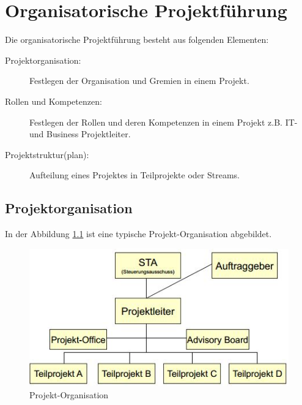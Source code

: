 \chapter{Organisatorische Projektführung}

Die organisatorische Projektführung besteht aus folgenden Elementen:
\begin{description}
	\item[Projektorganisation:] Festlegen der Organisation und Gremien in einem Projekt.
	\item[Rollen und Kompetenzen:] Festlegen der Rollen und deren Kompetenzen in einem Projekt z.B. IT- und Business Projektleiter.
	\item[Projektstruktur(plan):] Aufteilung eines Projektes in Teilprojekte oder Streams.
\end{description}

\section{Projektorganisation}
In der Abbildung \ref{fig:projekt-organisation} ist eine typische Projekt-Organisation abgebildet.

\begin{figure}[h!]
\centering
\includegraphics[width=0.7\linewidth]{fig/projekt-organisation}
\caption{Projekt-Organisation}
\label{fig:projekt-organisation}
\end{figure}

